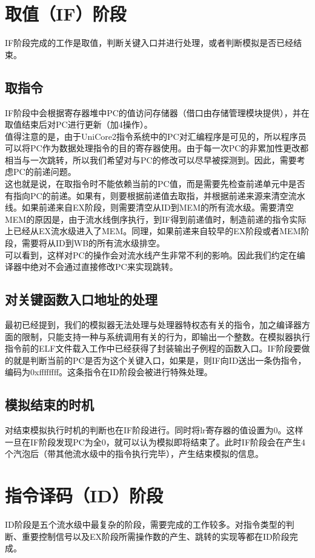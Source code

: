 \documentclass[12pt,a4paper,Flow]{report}
\begin{document}
\section{取值（IF）阶段}
IF阶段完成的工作是取值，判断关键入口并进行处理，或者判断模拟是否已经结束。
\subsection{取指令}
IF阶段中会根据寄存器堆中PC的值访问存储器（借口由存储管理模块提供），并在取值结束后对PC进行更新（加4操作）。\\
\indent 值得注意的是，由于UniCore2指令系统中的PC对汇编程序是可见的，所以程序员可以将PC作为数据处理指令的目的寄存器使用。由于每一次PC的非累加性更改都相当与一次跳转，所以我们希望对与PC的修改可以尽早被探测到。因此，需要考虑PC的前递问题。\\
\indent 这也就是说，在取指令时不能依赖当前的PC值，而是需要先检查前递单元中是否有指向PC的前递。如果有，则要根据前递值去取指，并根据前递来源来清空流水线。如果前递来自EX阶段，则需要清空从ID到MEM的所有流水级。需要清空MEM的原因是，由于流水线倒序执行，到IF得到前递值时，制造前递的指令实际上已经从EX流水级进入了MEM。同理，如果前递来自较早的EX阶段或者MEM阶段，需要将从ID到WB的所有流水级排空。\\
\indent 可以看到，这样对PC的操作会对流水线产生非常不利的影响。因此我们约定在编译器中绝对不会通过直接修改PC来实现跳转。
\subsection{对关键函数入口地址的处理}
最初已经提到，我们的模拟器无法处理与处理器特权态有关的指令，加之编译器方面的限制，只能支持一种与系统调用有关的行为，即输出一个整数。在模拟器执行指令前的ELF文件载入工作中已经获得了封装输出子例程的函数入口。IF阶段要做的就是判断当前的PC是否为这个关键入口，如果是，则IF向ID送出一条伪指令，编码为0xffffffff。这条指令在ID阶段会被进行特殊处理。
\subsection{模拟结束的时机}
对结束模拟执行时机的判断也在IF阶段进行。同时将lr寄存器的值设置为0。这样一旦在IF阶段发现PC为全0，就可以认为模拟即将结束了。此时IF阶段会在产生4个汽泡后（带其他流水级中的指令执行完毕），产生结束模拟的信息。
\section{指令译码（ID）阶段}
ID阶段是五个流水级中最复杂的阶段，需要完成的工作较多。对指令类型的判断、重要控制信号以及EX阶段所需操作数的产生、跳转的实现等都在ID阶段完成。
\end{document}

